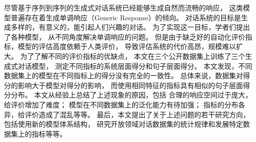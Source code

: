 % 
% 
% 
% 

\begin{cabstract}
    尽管基于序列到序列的生成式对话系统已经能够生成自然而流畅的响应，
    这类模型普遍存在着生成单调响应（Generic Response）的倾向。
    对话系统的目标是生成多样的，有意义的，能引起人们兴趣的对话。
    为了实现这一目标，学者们提出了各种模型，
    从不同角度解决单调响应的问题。
    但是由于缺乏好的自动化评价指标，模型的评估高度依赖于人类评价，
    导致评估系统的代价高昂，规模难以扩大。
    为了了解不同的评价指标的优缺点，
    本文在三个公开数据集上训练了三个生成式对话模型，
    测定不同指标的系统层面得分和句子层面得分。
    本文发现，不同数据集上的模型在不同指标上的得分没有完全的一致性。
    总体来说，数据集对得分的影响大于模型对得分的影响，
    而使用相同特征的指标具有相似的句子层面得分分布。
    本文从经验上总结了上述现象的原因，包括
    合理的响应空间过于庞大，给评价增加了难度；
    模型在不同数据集上的泛化能力有待加强；
    指标的分布各异，给评价造成了混乱等等。
    最后，本文提出了关于上述问题的若干研究方向，
    包括使用新的模型体系结构，
    研究开放领域对话数据集的统计规律和发展特定数据集上的指标等等。
\end{cabstract}

